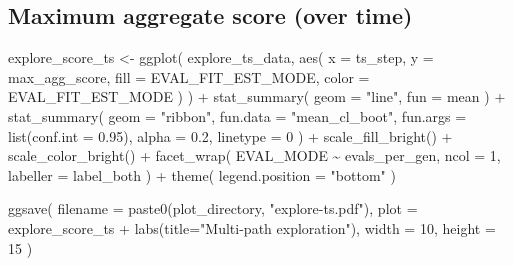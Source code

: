 \documentclass[
]{book}
\newenvironment{Shaded}{\begin{snugshade}}{\end{snugshade}}
\newcommand{\AttributeTok}[1]{\textcolor[rgb]{0.77,0.63,0.00}{#1}}
\newcommand{\DecValTok}[1]{\textcolor[rgb]{0.00,0.00,0.81}{#1}}
\newcommand{\FloatTok}[1]{\textcolor[rgb]{0.00,0.00,0.81}{#1}}
\newcommand{\FunctionTok}[1]{\textcolor[rgb]{0.00,0.00,0.00}{#1}}
\newcommand{\NormalTok}[1]{#1}
\newcommand{\OtherTok}[1]{\textcolor[rgb]{0.56,0.35,0.01}{#1}}
\newcommand{\SpecialCharTok}[1]{\textcolor[rgb]{0.00,0.00,0.00}{#1}}
\newcommand{\StringTok}[1]{\textcolor[rgb]{0.31,0.60,0.02}{#1}}
\begin{document}
\hypertarget{maximum-aggregate-score-over-time}{%
\subsection{Maximum aggregate score (over time)}\label{maximum-aggregate-score-over-time}}

\begin{Shaded}
\begin{Highlighting}[]
\NormalTok{explore\_score\_ts }\OtherTok{\textless{}{-}} \FunctionTok{ggplot}\NormalTok{(}
\NormalTok{    explore\_ts\_data,}
    \FunctionTok{aes}\NormalTok{(}
      \AttributeTok{x =}\NormalTok{ ts\_step,}
      \AttributeTok{y =}\NormalTok{ max\_agg\_score,}
      \AttributeTok{fill =}\NormalTok{ EVAL\_FIT\_EST\_MODE,}
      \AttributeTok{color =}\NormalTok{ EVAL\_FIT\_EST\_MODE}
\NormalTok{    )}
\NormalTok{  ) }\SpecialCharTok{+}
  \FunctionTok{stat\_summary}\NormalTok{(}
    \AttributeTok{geom =} \StringTok{"line"}\NormalTok{,}
    \AttributeTok{fun =}\NormalTok{ mean}
\NormalTok{  ) }\SpecialCharTok{+}
  \FunctionTok{stat\_summary}\NormalTok{(}
    \AttributeTok{geom =} \StringTok{"ribbon"}\NormalTok{,}
    \AttributeTok{fun.data =} \StringTok{"mean\_cl\_boot"}\NormalTok{,}
    \AttributeTok{fun.args =} \FunctionTok{list}\NormalTok{(}\AttributeTok{conf.int =} \FloatTok{0.95}\NormalTok{),}
    \AttributeTok{alpha =} \FloatTok{0.2}\NormalTok{,}
    \AttributeTok{linetype =} \DecValTok{0}
\NormalTok{  ) }\SpecialCharTok{+}
  \FunctionTok{scale\_fill\_bright}\NormalTok{() }\SpecialCharTok{+}
  \FunctionTok{scale\_color\_bright}\NormalTok{() }\SpecialCharTok{+}
  \FunctionTok{facet\_wrap}\NormalTok{(}
\NormalTok{    EVAL\_MODE }\SpecialCharTok{\textasciitilde{}}\NormalTok{ evals\_per\_gen,}
    \AttributeTok{ncol =} \DecValTok{1}\NormalTok{,}
    \AttributeTok{labeller =}\NormalTok{ label\_both}
\NormalTok{  ) }\SpecialCharTok{+}
  \FunctionTok{theme}\NormalTok{(}
    \AttributeTok{legend.position =} \StringTok{"bottom"}
\NormalTok{  )}

\FunctionTok{ggsave}\NormalTok{(}
  \AttributeTok{filename =} \FunctionTok{paste0}\NormalTok{(plot\_directory, }\StringTok{"explore{-}ts.pdf"}\NormalTok{),}
  \AttributeTok{plot =}\NormalTok{ explore\_score\_ts }\SpecialCharTok{+} \FunctionTok{labs}\NormalTok{(}\AttributeTok{title=}\StringTok{"Multi{-}path exploration"}\NormalTok{),}
  \AttributeTok{width =} \DecValTok{10}\NormalTok{,}
  \AttributeTok{height =} \DecValTok{15}
\NormalTok{)}
\end{Highlighting}
\end{Shaded}
\end{document}
